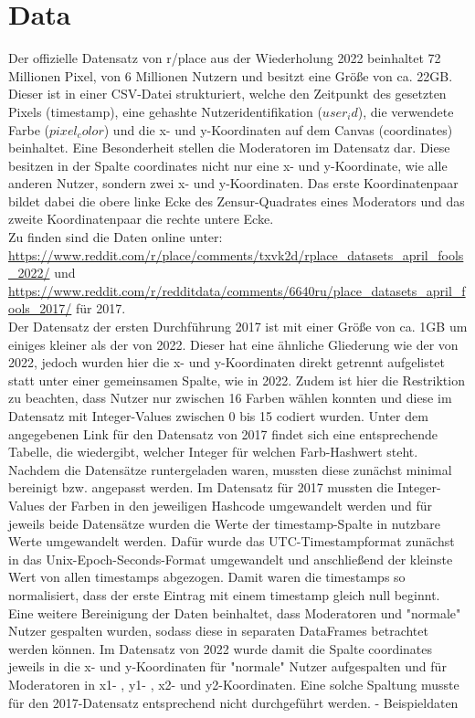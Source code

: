 \section{Data} \label{data}  %

Der offizielle Datensatz von r/place aus der Wiederholung 2022 beinhaltet 72 Millionen Pixel, von 6 Millionen Nutzern und besitzt eine Größe von ca. 22GB. 
Dieser ist in einer CSV-Datei strukturiert, welche den Zeitpunkt des gesetzten Pixels (timestamp), eine gehashte Nutzeridentifikation ($user_id$), die verwendete Farbe ($pixel_color$) und die x- und y-Koordinaten auf dem Canvas (coordinates) beinhaltet. Eine Besonderheit stellen die Moderatoren im Datensatz dar. Diese besitzen in der Spalte coordinates nicht nur eine x- und y-Koordinate, wie alle anderen Nutzer, sondern zwei x- und y-Koordinaten. Das erste Koordinatenpaar bildet dabei die obere linke Ecke des Zensur-Quadrates eines Moderators und das zweite Koordinatenpaar die rechte untere Ecke. \\
Zu finden sind die Daten online unter: \url{https://www.reddit.com/r/place/comments/txvk2d/rplace_datasets_april_fools_2022/} und \url{https://www.reddit.com/r/redditdata/comments/6640ru/place_datasets_april_fools_2017/} für 2017.\\
Der Datensatz der ersten Durchführung 2017 ist mit einer Größe von ca. 1GB um einiges kleiner als der von 2022. Dieser hat eine ähnliche Gliederung wie der von 2022, jedoch wurden hier die x- und y-Koordinaten direkt getrennt aufgelistet statt unter einer gemeinsamen Spalte, wie in 2022. Zudem ist hier die Restriktion zu beachten, dass Nutzer nur zwischen 16 Farben wählen konnten und diese im Datensatz mit Integer-Values zwischen 0 bis 15 codiert wurden. Unter dem angegebenen Link für den Datensatz von 2017 findet sich eine entsprechende Tabelle, die wiedergibt, welcher Integer für welchen Farb-Hashwert steht. \\
Nachdem die Datensätze runtergeladen waren, mussten diese zunächst minimal bereinigt bzw. angepasst werden. Im Datensatz für 2017 mussten die Integer-Values der Farben in den jeweiligen Hashcode umgewandelt werden und für jeweils beide Datensätze wurden die Werte der timestamp-Spalte in nutzbare Werte umgewandelt werden. Dafür wurde das UTC-Timestampformat zunächst in das Unix-Epoch-Seconds-Format umgewandelt und anschließend der kleinste Wert von allen timestamps abgezogen. Damit waren die timestamps so normalisiert, dass der erste Eintrag mit einem timestamp gleich null beginnt. \\
Eine weitere Bereinigung der Daten beinhaltet, dass Moderatoren und "normale" Nutzer gespalten wurden, sodass diese in separaten DataFrames betrachtet werden können. Im Datensatz von 2022 wurde damit die Spalte coordinates jeweils in die x- und y-Koordinaten für "normale" Nutzer aufgespalten und für Moderatoren in x1- , y1- , x2- und y2-Koordinaten. Eine solche Spaltung musste für den 2017-Datensatz entsprechend nicht durchgeführt werden.
-  Beispieldaten\\




